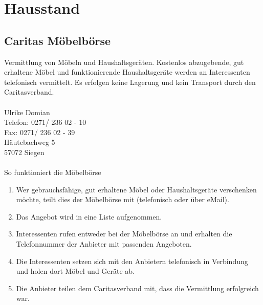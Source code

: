 \chapter{Hausstand} 

\section{Caritas Möbelbörse}
Vermittlung von Möbeln und Haushaltsgeräten. Kostenlos abzugebende, gut erhaltene Möbel und funktionierende Haushaltsgeräte werden an Interessenten telefonisch vermittelt. Es erfolgen keine Lagerung und kein Transport durch den Caritasverband.\\
\\
Ulrike Domian \\
Telefon: 0271/ 236 02 - 10\\
Fax: 0271/ 236 02 - 39 \\
Häutebachweg 5\\
57072 Siegen \\
\\
So funktioniert die Möbelbörse\\
\begin{enumerate}
	\item Wer gebrauchsfähige, gut erhaltene Möbel oder Haushaltsgeräte verschenken möchte, teilt dies der Möbelbörse mit (telefonisch oder über eMail).  
	\item Das Angebot wird in eine Liste aufgenommen.
	\item Interessenten rufen entweder bei der Möbelbörse an und erhalten die Telefonnummer der Anbieter mit passenden Angeboten.  
	\item Die Interessenten setzen sich mit den Anbietern telefonisch in Verbindung und holen dort Möbel und Geräte ab.  
	\item Die Anbieter teilen dem Caritasverband mit, dass die Vermittlung erfolgreich war.
\end{enumerate}  

